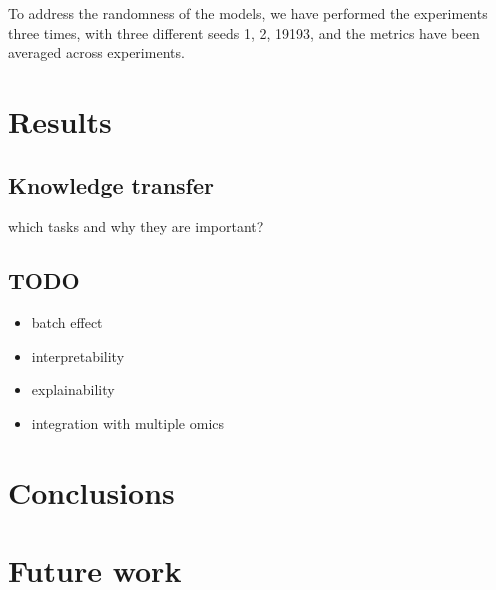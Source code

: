 \documentclass[12pt, a4paper]{article}
\begin{document}
To address the randomness of the models, we have performed the experiments three times, with three different seeds 1, 2, 19193, and the metrics have been averaged across experiments.


\section{Results}

\subsection{Knowledge transfer}

which tasks and why they are important?

\subsection{TODO}

\begin{itemize}
    \item batch effect
    \item interpretability
    \item explainability
    \item integration with multiple omics
\end{itemize}

\section{Conclusions}

\section{Future work}




\appendix





\end{document}
